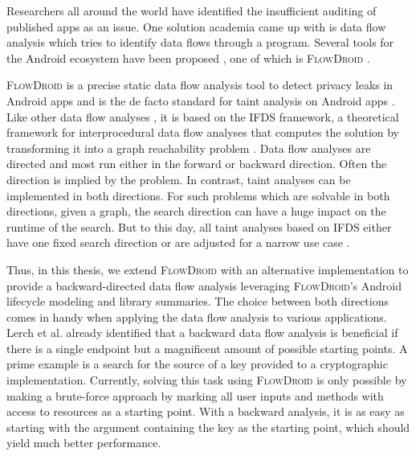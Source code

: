 \documentclass[../draft.tex]{subfiles}
\begin{document}
    Researchers all around the world have identified the insufficient auditing of published apps as an issue.
    One solution academia came up with is data flow analysis which tries to identify data flows through a program.
    Several tools for the Android ecosystem have been proposed \cite{Gibler2012, Zhao2012, Yang2012, Mann2012}, one of which is \textsc{FlowDroid} \cite{Arzt2014}.

    \textsc{FlowDroid} is a precise static data flow analysis tool to detect privacy leaks in Android apps and is the de facto standard for taint analysis on Android apps \cite{Arzt2014}.
    Like other data flow analyses \cite{Lerch2014,NguyenQuangDo2017,Allen2021}, it is based on the IFDS framework, a theoretical framework for interprocedural data flow analyses that computes the solution by transforming it into a graph reachability problem \cite{Reps1995}.
    Data flow analyses are directed and most run either in the forward or backward direction.
    Often the direction is implied by the problem. In contrast, taint analyses can be implemented in both directions.
    For such problems which are solvable in both directions, given a graph, the search direction can have a huge impact on the runtime of the search.    
    But to this day, all taint analyses based on IFDS either have one fixed search direction \cite{Arzt2014,Allen2021,NguyenQuangDo2017} or are adjusted for a narrow use case \cite{Lerch2014}.

    Thus, in this thesis, we extend \textsc{FlowDroid} with an alternative implementation to provide a backward-directed data flow analysis leveraging \textsc{FlowDroid}'s Android lifecycle modeling and library summaries.
    The choice between both directions comes in handy when applying the data flow analysis to various applications. Lerch et al.\cite{Lerch2014} already identified that a backward data flow analysis is beneficial if there is a single endpoint but a magnificent amount of possible starting points.
    A prime example is a search for the source of a key provided to a cryptographic implementation.
    Currently, solving this task using \textsc{FlowDroid} is only possible by making a brute-force approach by marking all user inputs and methods with access to resources as a starting point.
    With a backward analysis, it is as easy as starting with the argument containing the key as the starting point, which should yield much better performance.
\end{document}
